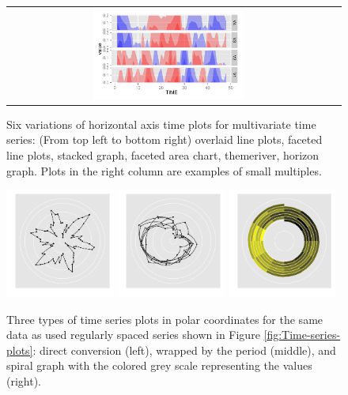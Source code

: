 \documentclass[12pt]{article}
\begin{document}
\begin{center}
\begin{figure}[htp]
\begin{centering}
\begin{tabular}{cc}
\includegraphics[width=0.48\textwidth]{graph/pipeline-02-horizon}
\end{tabular}
\end{centering}
\caption{\label{fig:horizontal-axis} Six variations of horizontal axis time plots for multivariate
time series: (From top left to bottom right) overlaid line plots, faceted line plots,  stacked graph, faceted area chart, themeriver, horizon graph. Plots in the right column are examples of small multiples. }
\end{figure}
\end{center}

\begin{center}
\begin{figure}[htp]
\begin{centering}
\includegraphics[width=0.32\textwidth]{graph/pipeline-03-polarline}
\includegraphics[width=0.32\textwidth]{graph/pipeline-03-polarperiod}
\includegraphics[width=0.32\textwidth]{graph/pipeline-03-spiral}
\end{centering}
\caption{\label{fig:polar-axis}Three types of time series plots
in polar coordinates for the same data as used regularly spaced series shown in Figure
\ref{fig:Time-series-plots}:  direct conversion (left), wrapped by the period (middle), and
spiral graph with the colored grey scale representing the values (right).}
\end{figure}
\end{center}
\end{document}
